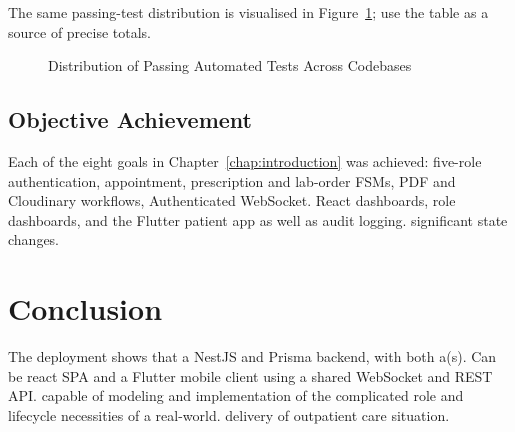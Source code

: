\documentclass[12pt,a4paper]{report}
\begin{document}
The same passing-test distribution is visualised in Figure~\ref{fig:test_chart}; use the table as a source of precise totals.

\begin{figure}[tbp]
\centering
{}
\caption{Distribution of Passing Automated Tests Across Codebases}
\label{fig:test_chart}
\end{figure}

\subsection{Objective Achievement}

Each of the eight goals in Chapter~\ref{chap:introduction} was achieved: five-role authentication, appointment,
prescription and lab-order FSMs, PDF and Cloudinary workflows, Authenticated WebSocket.
React dashboards, role dashboards, and the Flutter patient app as well as audit logging.
significant state changes.

\section{Conclusion}

The deployment shows that a NestJS and Prisma backend, with both a(s).
Can be react SPA and a Flutter mobile client using a shared WebSocket and REST API.
capable of modeling and implementation of the complicated role and lifecycle necessities of a real-world.
delivery of outpatient care situation.
\end{document}
